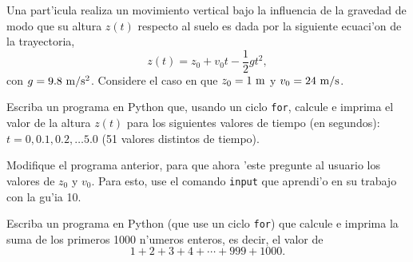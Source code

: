\documentclass[11pt]{exam}
\begin{document}
\firstpageheadrule
\runningheadrule
{}
\cfoot{ }
\begin{flushleft}
\vspace{0.2in}

\vspace{0.25cm}
\end{flushleft}

\begin{questions}

\item Una part'icula realiza un movimiento vertical bajo la influencia de la gravedad de modo que su altura $z(t)$ respecto al suelo es dada por la siguiente ecuaci'on de la trayectoria,
\begin{equation}
z(t)=z_0 + v_0 t -\frac{1}{2}gt^2,
\end{equation}
con $g=9.8 {\ \rm m/s^2}$. Considere el caso en que $z_0=1 {\ \rm m}$ y $v_0=24 {\ \rm m/s}$.

Escriba un programa en Python que, usando un ciclo \texttt{for}, calcule e imprima el valor de la altura $z(t)$ para los siguientes valores de tiempo (en segundos): $t=0, 0.1, 0.2, \dots 5.0$ (51 valores distintos de tiempo).

\item Modifique el programa anterior, para que ahora 'este pregunte al usuario los valores de $z_0$ y $v_0$. Para esto, use el comando \texttt{input} que aprendi'o en su trabajo con la gu'ia 10.

\item Escriba un programa en Python (que use un ciclo \texttt{for}) que calcule e imprima la suma de los primeros 1000 n'umeros enteros, es decir, el valor de 
\begin{equation}
1 + 2 + 3 + 4  + \cdots + 999 + 1000.
\end{equation}



\end{questions}
\end{document}
